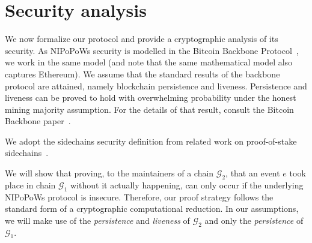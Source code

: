 \section{Security analysis}

We now formalize our protocol and provide a cryptographic analysis of its
security. As NIPoPoWs security is modelled in the Bitcoin
Backbone Protocol~\cite{backbone}, we work in the same model (and note that the
same mathematical model also captures Ethereum). We assume that the standard
results of the backbone protocol are attained, namely blockchain persistence and
liveness. Persistence and liveness can be proved to hold with overwhelming
probability under the honest mining majority assumption. For the details of that
result, consult the Bitcoin Backbone paper~\cite{backbone}.

We adopt the sidechains security definition from related work on proof-of-stake
sidechains~\cite{pos-sidechains}.

We will show that proving, to the maintainers of a chain $\mathcal{G}_2$, that
an event $e$ took place in chain $\mathcal{G}_1$ without it actually happening,
can only occur if the underlying NIPoPoWs protocol is insecure. Therefore, our
proof strategy follows the standard form of a cryptographic computational
reduction. In our assumptions, we will make use of the \emph{persistence} and
\emph{liveness} of $\mathcal{G}_2$ and only the \emph{persistence} of
$\mathcal{G}_1$.

